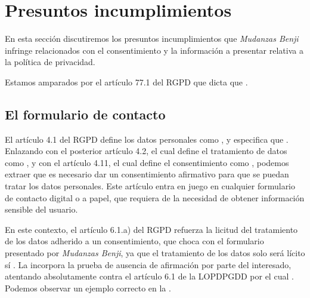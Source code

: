 \section{Presuntos incumplimientos}
En esta sección discutiremos los presuntos incumplimientos que \textit{Mudanzas Benji} infringe relacionados con el consentimiento y la información a presentar relativa a la política de privacidad.

Estamos amparados por el artículo 77.1 del RGPD que dicta que .



\subsection{El formulario de contacto}\label{subsec:contacto}
El artículo 4.1 del RGPD define los datos personales como , y especifica que . Enlazando con el posterior artículo 4.2, el cual define el tratamiento de datos como , y con el artículo 4.11, el cual define el consentimiento como , podemos extraer que es necesario dar un consentimiento afirmativo para que se puedan tratar los datos personales. Este artículo entra en juego en cualquier formulario de contacto digital o a papel, que requiera de la necesidad de obtener información sensible del usuario.

En este contexto, el artículo 6.1.a) del RGPD refuerza la licitud del tratamiento de los datos adherido a un consentimiento, que choca con el formulario presentado por \textit{Mudanzas Benji}, ya que el tratamiento de los datos solo será lícito sí . La  incorpora la prueba de ausencia de afirmación por parte del interesado, atentando absolutamente contra el artículo 6.1 de la LOPDPGDD por el cual . Podemos observar un ejemplo correcto en la .

